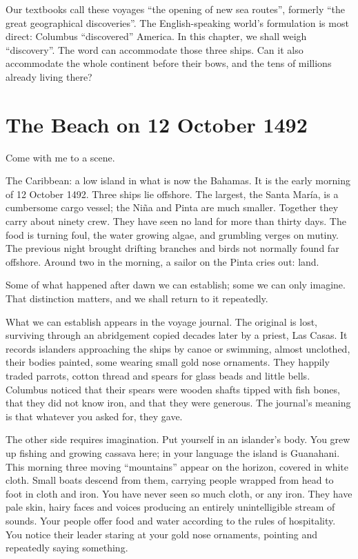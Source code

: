 Our textbooks call these voyages ``the opening of new sea routes'', formerly ``the great geographical discoveries''. The English-speaking world's formulation is most direct: Columbus ``discovered'' America. In this chapter, we shall weigh ``discovery''. The word can accommodate those three ships. Can it also accommodate the whole continent before their bows, and the tens of millions already living there?

\section{The Beach on 12 October 1492}
Come with me to a scene.

The Caribbean: a low island in what is now the Bahamas. It is the early morning of 12 October 1492. Three ships lie offshore. The largest, the Santa María, is a cumbersome cargo vessel; the Niña and Pinta are much smaller. Together they carry about ninety crew. They have seen no land for more than thirty days. The food is turning foul, the water growing algae, and grumbling verges on mutiny. The previous night brought drifting branches and birds not normally found far offshore. Around two in the morning, a sailor on the Pinta cries out: land.

Some of what happened after dawn we can establish; some we can only imagine. That distinction matters, and we shall return to it repeatedly.

What we can establish appears in the voyage journal. The original is lost, surviving through an abridgement copied decades later by a priest, Las Casas. It records islanders approaching the ships by canoe or swimming, almost unclothed, their bodies painted, some wearing small gold nose ornaments. They happily traded parrots, cotton thread and spears for glass beads and little bells. Columbus noticed that their spears were wooden shafts tipped with fish bones, that they did not know iron, and that they were generous. The journal's meaning is that whatever you asked for, they gave.

The other side requires imagination. Put yourself in an islander's body. You grew up fishing and growing cassava here; in your language the island is Guanahani. This morning three moving ``mountains'' appear on the horizon, covered in white cloth. Small boats descend from them, carrying people wrapped from head to foot in cloth and iron. You have never seen so much cloth, or any iron. They have pale skin, hairy faces and voices producing an entirely unintelligible stream of sounds. Your people offer food and water according to the rules of hospitality. You notice their leader staring at your gold nose ornaments, pointing and repeatedly saying something.

